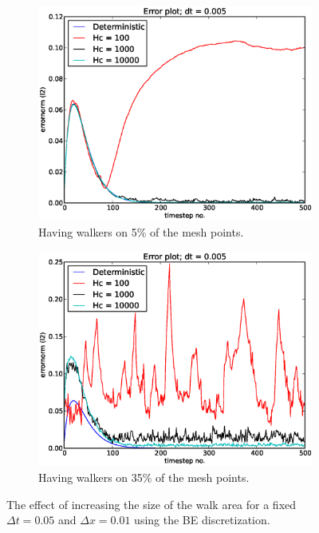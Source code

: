 \begin{figure}[H]
\centering
\begin{subfigure}[b]{0.48\textwidth}
 \includegraphics[width=\textwidth]{../doc/results/experiment_16042014_1139_convergence_tests_etc/results/errorplot.eps}
 \caption{Having walkers on 5\% of the mesh points.}
 \label{errorplot_BE1D_walk_5_percent}
\end{subfigure}
\begin{subfigure}[b]{0.48\textwidth}
 \includegraphics[width=\textwidth]{../doc/results/experiment_16042014_1202_tests_35percent_walkers/results/errorplot.eps}
 \caption{Having walkers on 35\% of the mesh points.}
 \label{errorplot_BE1D_walk_35_percent}
\end{subfigure}
\caption[Effects of increasing relative size of walk area]{The effect of increasing the size of the walk area for a fixed $\Delta t = 0.05$ and $\Delta x = 0.01$ using the BE discretization.}
\label{testing_walk_area_size_BE}
\end{figure}

